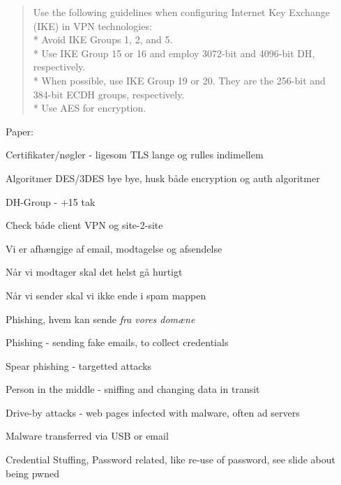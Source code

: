 \documentclass[Screen16to9,17pt]{foils}
\begin{document}

\begin{quote}
  Use the following guidelines when configuring Internet Key Exchange (IKE) in VPN technologies:\\
* Avoid IKE Groups 1, 2, and 5.\\
* Use IKE Group 15 or 16 and employ 3072-bit and 4096-bit DH, respectively.\\
* When possible, use IKE Group 19 or 20. They are the 256-bit and \\
384-bit ECDH groups, respectively.\\
* Use AES for encryption.
\end{quote}
Paper:\\
{\small {}}

\begin{list2}
\item Certifikater/nøgler - ligesom TLS lange og rulles indimellem
\item Algoritmer DES/3DES bye bye, husk både encryption og auth algoritmer
\item DH-Group - +15 tak
\item Check både client VPN og site-2-site
\end{list2}



\begin{list2}
\item Vi er afhængige af email, modtagelse og afsendelse
\item Når vi modtager skal det helst gå hurtigt
\item Når vi sender skal vi ikke ende i spam mappen
\item Phishing, hvem kan sende \emph{fra vores domæne}
\end{list2}



\begin{list2}
\item Phishing - sending fake emails, to collect credentials
\item Spear phishing - targetted attacks
\item Person in the middle - sniffing and changing data in transit
\item Drive-by attacks - web pages infected with malware, often ad servers
\item Malware transferred via USB or email
\item Credential Stuffing, Password related, like re-use of password, see slide about being pwned
\end{list2}
\end{document}
